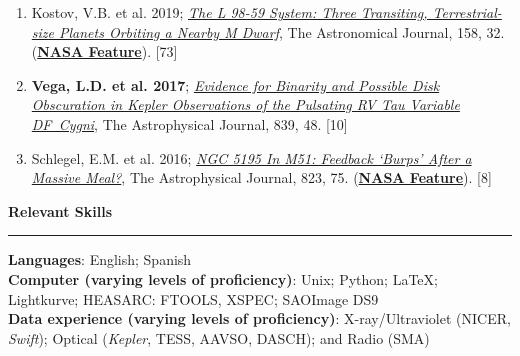 \documentclass[letter,11pt]{article}
\begin{document}
\begin{enumerate}[\bfseries 1.]
\item Kostov, V.B. et al. 2019; \href{https://ui.adsabs.harvard.edu/abs/2019AJ....158...32K/abstract}{{\it The L 98-59 System: Three Transiting, Terrestrial-size Planets Orbiting a Nearby M Dwarf}}, The Astronomical Journal, 158, 32.
(\href{https://www.nasa.gov/feature/goddard/2019/nasa-s-tess-mission-finds-its-smallest-planet-yet}{\bf NASA Feature}). [73]

\item {\bf Vega, L.D. et al. 2017}; \href{https://ui.adsabs.harvard.edu/abs/2017ApJ...839...48V/abstract}{{\it Evidence for Binarity and Possible Disk Obscuration in Kepler Observations of the Pulsating RV Tau Variable DF~Cygni}}, The Astrophysical Journal, 839, 48. [10]

\item Schlegel, E.M. et al. 2016; \href{https://ui.adsabs.harvard.edu/abs/2016ApJ...823...75S/abstract}{{\it NGC 5195 In M51: Feedback ‘Burps’ After a Massive Meal?}}, The Astrophysical Journal, 823, 75. (\href{https://www.nasa.gov/mission_pages/chandra/nasa-s-chandra-finds-supermassive-black-hole-burping-nearby.html}{\bf NASA Feature}). [8]

\end{enumerate}


\noindent
{\bf Relevant Skills} \\
\vspace{-10mm}
\begin{center}
\rule{\textwidth}{0.2mm}
\end{center}
\vspace{-3mm}
\noindent
\textbf{Languages}: English; Spanish\\
\textbf{Computer (varying levels of proficiency)}: Unix; Python; LaTeX; Lightkurve; HEASARC: FTOOLS, XSPEC; SAOImage DS9 \\
\textbf{Data experience (varying levels of proficiency)}: X-ray/Ultraviolet (NICER, {\it Swift}); Optical ({\it Kepler}, TESS, AAVSO, DASCH); and Radio (SMA) \\
\end{document}
